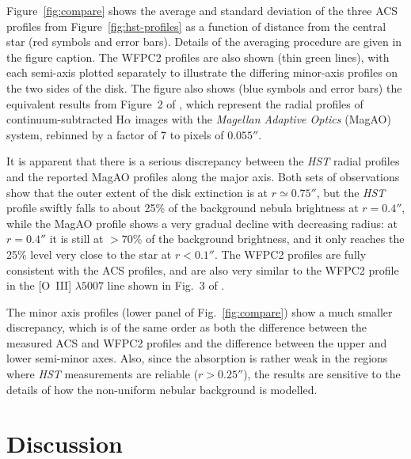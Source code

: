 \documentclass[oneside, 11pt]{article}
\begin{document}
Figure~\ref{fig:compare} shows the average and standard deviation of the three ACS profiles from Figure~\ref{fig:hst-profiles} as a function of distance from the central star (red symbols and error bars).  Details of the averaging procedure are given in the figure caption.   The WFPC2 profiles are also shown (thin green lines), with each semi-axis plotted separately to illustrate the differing minor-axis profiles on the two sides of the disk.    The figure also shows (blue symbols and error bars) the equivalent results from Figure~2 of \citet{Follette:2013a}, which represent the radial profiles of continuum-subtracted H\(\alpha\) images with the \textit{Magellan Adaptive Optics} (MagAO) system, rebinned by a factor of 7 to pixels of \(0.055''\). 

It is apparent that there is a serious discrepancy between the \emph{HST} radial profiles and the reported MagAO profiles along the major axis.   Both sets of observations show that the outer extent of the disk extinction is at \(r \simeq 0.75''\), but the \emph{HST} profile swiftly falls to about 25\% of the background nebula brightness at \(r = 0.4''\), while the MagAO profile shows a very gradual decline with decreasing radius: at \(r = 0.4''\) it is still at \(> 70\%\) of the background brightness, and it only reaches the 25\% level very close to the star at \(r < 0.1''\).    The WFPC2 profiles are fully consistent with the ACS profiles, and are also very similar to the WFPC2 profile in the [O~III] \(\lambda 5007\) line shown in Fig.~3 of \citet{McCaughrean:1996a}. 

The minor axis profiles (lower panel of Fig.~\ref{fig:compare}) show a much smaller discrepancy, which is of the same order as both the difference between the measured ACS and WFPC2 profiles and the difference between the upper and lower semi-minor axes.   Also, since the absorption is rather weak in the regions  where \textit{HST} measurements are reliable (\(r > 0.25''\)), the results are sensitive to the details of how the non-uniform nebular background is modelled. 


\section{Discussion}
\label{sec:discuss}
\end{document}
